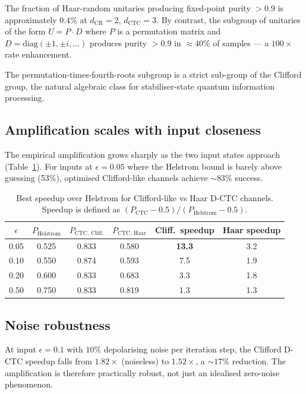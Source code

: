\documentclass[11pt,a4paper]{article}
\begin{document}
The fraction of Haar-random unitaries producing fixed-point purity
$> 0.9$ is approximately $0.4\%$ at $d_{\text{CR}} = 2$,
$d_{\text{CTC}} = 3$. By contrast, the subgroup of unitaries of the
form $U = P \cdot D$ where $P$ is a permutation matrix and
$D = \mathrm{diag}(\pm 1, \pm i, \ldots)$ produces purity $> 0.9$ in
$\approx 40\%$ of samples --- a $100\times$ rate enhancement.

The permutation-times-fourth-roots subgroup is a strict sub-group of
the Clifford group, the natural algebraic class for stabiliser-state
quantum information processing.

\subsection{Amplification scales with input closeness}

The empirical amplification grows sharply as the two input states
approach (Table~\ref{tab:amp-vs-eps}). For inputs at $\epsilon = 0.05$
where the Helstrom bound is barely above guessing (53\%),
optimised Clifford-like channels achieve $\sim 83\%$ success.

\begin{table}[h]
\centering
\caption{Best speedup over Helstrom for Clifford-like vs Haar D-CTC
channels. Speedup is defined as
$(P_{\text{CTC}} - 0.5)/(P_{\text{Helstrom}} - 0.5)$.}
\label{tab:amp-vs-eps}
\begin{tabular}{cccccc}
\toprule
$\epsilon$ & $P_{\text{Helstrom}}$ & $P_{\text{CTC, Cliff.}}$ & $P_{\text{CTC, Haar}}$ &
Cliff.\ speedup & Haar speedup \\
\midrule
0.05 & 0.525 & 0.833 & 0.580 & \textbf{13.3} & 3.2 \\
0.10 & 0.550 & 0.874 & 0.593 & 7.5 & 1.9 \\
0.20 & 0.600 & 0.833 & 0.683 & 3.3 & 1.8 \\
0.50 & 0.750 & 0.833 & 0.819 & 1.3 & 1.3 \\
\bottomrule
\end{tabular}
\end{table}

\subsection{Noise robustness}

At input $\epsilon = 0.1$ with $10\%$ depolarising noise per
iteration step, the Clifford D-CTC speedup falls from $1.82\times$
(noiseless) to $1.52\times$, a $\sim 17\%$ reduction. The
amplification is therefore practically robust, not just an
idealised zero-noise phenomenon.
\end{document}
